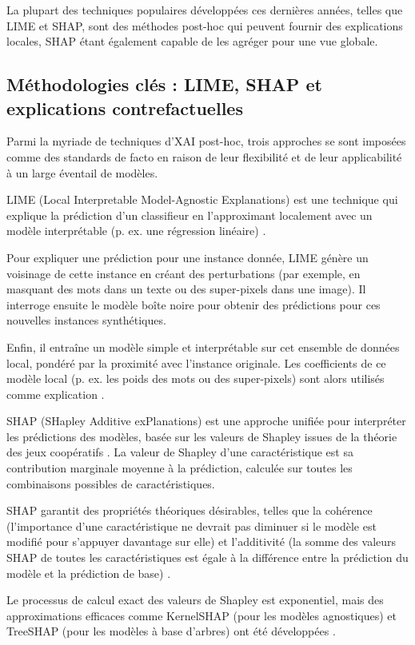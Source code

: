 La plupart des techniques populaires développées ces dernières années, telles que LIME et SHAP, sont des méthodes post-hoc qui peuvent fournir des explications locales, SHAP étant également capable de les agréger pour une vue globale.
\subsection{Méthodologies clés : LIME, SHAP et explications contrefactuelles}
Parmi la myriade de techniques d'XAI post-hoc, trois approches se sont imposées comme des standards de facto en raison de leur flexibilité et de leur applicabilité à un large éventail de modèles.

LIME (Local Interpretable Model-Agnostic Explanations) est une technique qui explique la prédiction d'un classifieur en l'approximant localement avec un modèle interprétable (p. ex. une régression linéaire) \citet{Ribeiro2016}.

Pour expliquer une prédiction pour une instance donnée, LIME génère un voisinage de cette instance en créant des perturbations (par exemple, en masquant des mots dans un texte ou des super-pixels dans une image). Il interroge ensuite le modèle boîte noire pour obtenir des prédictions pour ces nouvelles instances synthétiques.

Enfin, il entraîne un modèle simple et interprétable sur cet ensemble de données local, pondéré par la proximité avec l'instance originale. Les coefficients de ce modèle local (p. ex. les poids des mots ou des super-pixels) sont alors utilisés comme explication \citep{Ribeiro2016, Siganos2017}.

SHAP (SHapley Additive exPlanations) est une approche unifiée pour interpréter les prédictions des modèles, basée sur les valeurs de Shapley issues de la théorie des jeux coopératifs \citet{Lundberg2017}. La valeur de Shapley d'une caractéristique est sa contribution marginale moyenne à la prédiction, calculée sur toutes les combinaisons possibles de caractéristiques.

SHAP garantit des propriétés théoriques désirables, telles que la cohérence (l'importance d'une caractéristique ne devrait pas diminuer si le modèle est modifié pour s'appuyer davantage sur elle) et l'additivité (la somme des valeurs SHAP de toutes les caractéristiques est égale à la différence entre la prédiction du modèle et la prédiction de base) \citep{Lundberg2017, Siganos2017}.

Le processus de calcul exact des valeurs de Shapley est exponentiel, mais des approximations efficaces comme KernelSHAP (pour les modèles agnostiques) et TreeSHAP (pour les modèles à base d'arbres) ont été développées \citet{Lundberg2017}. 

